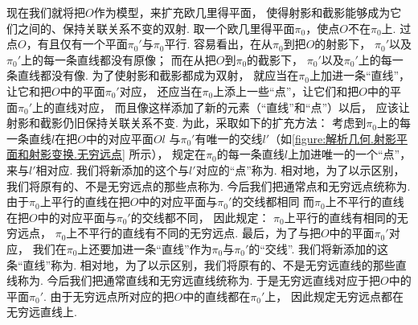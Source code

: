 现在我们就将把\(O\)作为模型，来扩充欧几里得平面，
使得射影和截影能够成为它们之间的、保持关联关系不变的双射.
取一个欧几里得平面\(\pi_0\)，使点\(O\)不在\(\pi_0\)上.
过点\(O\)，有且仅有一个平面\(\pi_0'\)与\(\pi_0\)平行.
容易看出，在从\(\pi_0\)到把\(O\)的射影下，
\(\pi_0'\)以及\(\pi_0'\)上的每一条直线都没有原像；
而在从把\(O\)到\(\pi_0\)的截影下，
\(\pi_0'\)以及\(\pi_0'\)上的每一条直线都没有像.
为了使射影和截影都成为双射，
就应当在\(\pi_0\)上加进一条“直线”，让它和把\(O\)中的平面\(\pi_0'\)对应，
还应当在\(\pi_0\)上添上一些“点”，让它们和把\(O\)中的平面\(\pi_0'\)上的直线对应，
而且像这样添加了新的元素（“直线”和“点”）以后，
应该让射影和截影仍旧保持关联关系不变.
为此，采取如下的扩充方法：
考虑到\(\pi_0\)上的每一条直线\(l\)在把\(O\)中的对应平面\(Ol\)
与\(\pi_0'\)有唯一的交线\(l'\)（如\cref{figure:解析几何.射影平面和射影变换.无穷远点} 所示），
规定在\(\pi_0\)的每一条直线\(l\)上加进唯一的一个“点”，来与\(l'\)相对应.
我们将新添加的这个与\(l'\)对应的“点”称为.
相对地，为了以示区别，我们将原有的、不是无穷远点的那些点称为.
今后我们把通常点和无穷远点统称为.
由于\(\pi_0\)上平行的直线在把\(O\)中的对应平面与\(\pi_0'\)的交线都相同
而\(\pi_0\)上不平行的直线在把\(O\)中的对应平面与\(\pi_0'\)的交线都不同，
因此规定：
\(\pi_0\)上平行的直线有相同的无穷远点，
\(\pi_0\)上不平行的直线有不同的无穷远点.
最后，为了与把\(O\)中的平面\(\pi_0'\)对应，
我们在\(\pi_0\)上还要加进一条“直线”作为\(\pi_0\)与\(\pi_0'\)的“交线”.
我们将新添加的这条“直线”称为.
相对地，为了以示区别，我们将原有的、不是无穷远直线的那些直线称为.
今后我们把通常直线和无穷远直线统称为.
于是无穷远直线对应于把\(O\)中的平面\(\pi_0'\).
由于无穷远点所对应的把\(O\)中的直线都在\(\pi_0'\)上，
因此规定无穷远点都在无穷远直线上.

